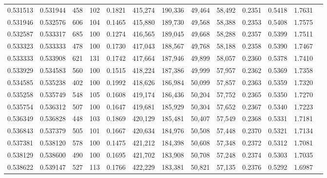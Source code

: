 \begin{tabular}{rrrrrrrrrrrrr}
0.531513 & 0.531944 &    458 &   102 &                                     0.1821 & 415,274 & 190,336 &  49,464 &  58,492 & 0.2351 & 0.5418 & 1.7631 \\
0.531946 & 0.532576 &    606 &   104 &                                     0.1465 & 415,880 & 189,730 &  49,568 &  58,388 & 0.2353 & 0.5408 & 1.7575 \\
0.532587 & 0.533317 &    685 &   100 &                                     0.1274 & 416,565 & 189,045 &  49,668 &  58,288 & 0.2357 & 0.5399 & 1.7511 \\
0.533323 & 0.533333 &    478 &   100 &                                     0.1730 & 417,043 & 188,567 &  49,768 &  58,188 & 0.2358 & 0.5390 & 1.7467 \\
0.533333 & 0.533908 &    621 &   131 &                                     0.1742 & 417,664 & 187,946 &  49,899 &  58,057 & 0.2360 & 0.5378 & 1.7410 \\
0.533929 & 0.534583 &    560 &   100 &                                     0.1515 & 418,224 & 187,386 &  49,999 &  57,957 & 0.2362 & 0.5369 & 1.7358 \\
0.534585 & 0.535238 &    402 &   100 &                                     0.1992 & 418,626 & 186,984 &  50,099 &  57,857 & 0.2363 & 0.5359 & 1.7320 \\
0.535258 & 0.535749 &    548 &   105 &                                     0.1608 & 419,174 & 186,436 &  50,204 &  57,752 & 0.2365 & 0.5350 & 1.7270 \\
0.535754 & 0.536312 &    507 &   100 &                                     0.1647 & 419,681 & 185,929 &  50,304 &  57,652 & 0.2367 & 0.5340 & 1.7223 \\
0.536349 & 0.536828 &    448 &   103 &                                     0.1869 & 420,129 & 185,481 &  50,407 &  57,549 & 0.2368 & 0.5331 & 1.7181 \\
0.536843 & 0.537379 &    505 &   101 &                                     0.1667 & 420,634 & 184,976 &  50,508 &  57,448 & 0.2370 & 0.5321 & 1.7134 \\
0.537381 & 0.538120 &    578 &   100 &                                     0.1475 & 421,212 & 184,398 &  50,608 &  57,348 & 0.2372 & 0.5312 & 1.7081 \\
0.538129 & 0.538600 &    490 &   100 &                                     0.1695 & 421,702 & 183,908 &  50,708 &  57,248 & 0.2374 & 0.5303 & 1.7035 \\
0.538622 & 0.539147 &    527 &   113 &                                     0.1766 & 422,229 & 183,381 &  50,821 &  57,135 & 0.2376 & 0.5292 & 1.6987 \\

\end{tabular}
